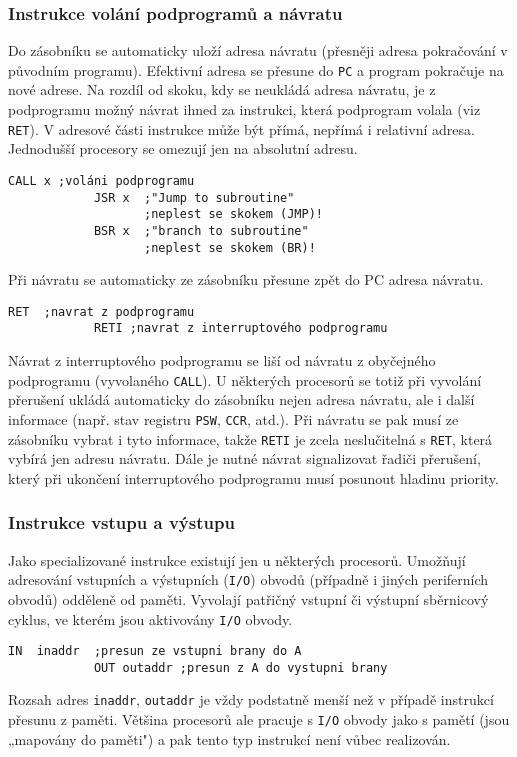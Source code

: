         \subsubsection{Instrukce volání podprogramů a návratu} 
          Do zásobníku se automaticky uloží adresa návratu (přesněji adresa pokračování v původním
          programu). Efektivní adresa se přesune do \texttt{PC} a program pokračuje na nové adrese.
          Na rozdíl od skoku, kdy se neukládá adresa návratu, je z podprogramu možný návrat ihned za
          instrukci, která podprogram volala (viz \texttt{RET}). V adresové části instrukce může být
          přímá, nepřímá i relativní adresa. Jednodušší procesory se omezují jen na absolutní
          adresu.
          \begin{lstlisting}[style=luaMITASMStyle]
            CALL x ;voláni podprogramu
            JSR x  ;"Jump to subroutine"
                   ;neplest se skokem (JMP)!
            BSR x  ;"branch to subroutine" 
                   ;neplest se skokem (BR)!
          \end{lstlisting}
          Při návratu se automaticky ze zásobníku přesune zpět do PC adresa návratu.
          \begin{lstlisting}[style=luaMITASMStyle]
            RET  ;navrat z podprogramu
            RETI ;navrat z interruptového podprogramu
          \end{lstlisting}
          
          Návrat z interruptového podprogramu se liší od návratu z obyčejného podprogramu 
          (vyvolaného \texttt{CALL}). U některých procesorů se totiž při vyvolání přerušení ukládá 
          automaticky do zásobníku nejen adresa návratu, ale i další informace (např. stav registru 
          \texttt{PSW}, \texttt{CCR}, atd.). Při návratu se pak musí ze zásobníku vybrat i tyto 
          informace, takže \texttt{RETI} je zcela neslučitelná s \texttt{RET}, která vybírá jen 
          adresu návratu. Dále je nutné návrat signalizovat řadiči přerušení, který při ukončení 
          interruptového podprogramu musí posunout hladinu priority.
          
        \subsubsection{Instrukce vstupu a výstupu}
          Jako specializované instrukce existují jen u některých procesorů. Umožňují adresování
          vstupních a výstupních (\texttt{I/O}) obvodů (případně i jiných periferních obvodů)
          odděleně od paměti. Vyvolají patřičný vstupní či výstupní sběrnicový cyklus, ve kterém
          jsou aktivovány \texttt{I/O} obvody.          
          \begin{lstlisting}[style=luaMITASMStyle]
            IN  inaddr  ;presun ze vstupni brany do A
            OUT outaddr ;presun z A do vystupni brany
          \end{lstlisting}        
          Rozsah adres \texttt{inaddr}, \texttt{outaddr} je vždy podstatně menší než v případě 
          instrukcí přesunu z paměti. Většina procesorů ale pracuje s \texttt{I/O} obvody jako s 
          pamětí (jsou „mapovány do paměti") a pak tento typ instrukcí není vůbec realizován.
          
